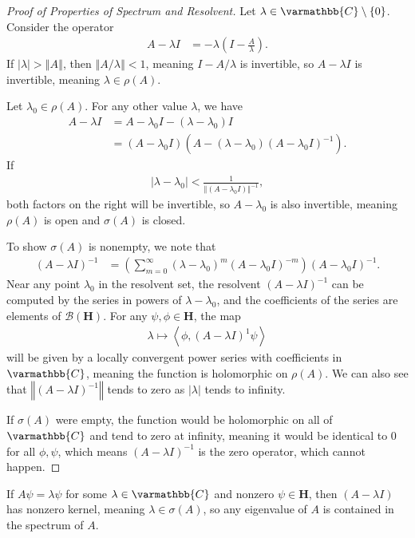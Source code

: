 \documentclass[12pt]{extarticle}
\newcommand{\C}{\varmathbb{C}}
\newcommand{\iprod}[2]{\left\langle #1,#2\right\rangle}
\newcommand{\norm}[1]{\left\Vert #1\right\Vert}
\theoremstyle{plain}
\theoremstyle{definition}
\theoremstyle{remark}
\renewcommand{\newline}{\hfill\break}
\begin{document}
  \begin{proof}[Proof of Properties of Spectrum and Resolvent]
    Let $\lambda \in \C\setminus \{0\}$. Consider the operator
    \begin{align*}
      A - \lambda I &= -\lambda \left(I - \frac{A}{\lambda}\right).
    \end{align*}
    If $|\lambda| > \norm{A}$, then $\norm{A / \lambda} < 1$, meaning $I - A/\lambda$ is invertible, so $A - \lambda I$ is invertible, meaning $\lambda \in \rho(A)$.\newline

    Let $\lambda_0\in \rho(A)$. For any other value $\lambda$, we have
    \begin{align*}
      A - \lambda I &= A - \lambda_0 I - (\lambda - \lambda_0)I\\
                    &= (A-\lambda_0 I)\left(A - (\lambda - \lambda_0)(A-\lambda_0 I)^{-1}\right).
    \end{align*}
    If
    \begin{align*}
      |\lambda - \lambda_0| < \frac{1}{\norm{(A - \lambda_0 I)}^{-1}},
    \end{align*}
    both factors on the right will be invertible, so $A - \lambda_0$ is also invertible, meaning $\rho(A)$ is open and $\sigma(A)$ is closed.\newline

    To show $\sigma(A)$ is nonempty, we note that
    \begin{align*}
      \left(A - \lambda I\right)^{-1} &= \left(\sum_{m=0}^{\infty}\left(\lambda - \lambda_0\right)^m\left(A - \lambda_0 I\right)^{-m}\right)\left(A - \lambda_0 I\right)^{-1}.
    \end{align*}
    Near any point $\lambda_0$ in the resolvent set, the resolvent $(A-\lambda I)^{-1}$ can be computed by the series in powers of $\lambda - \lambda_0$, and the coefficients of the series are elements of $\mathcal{B}\left(\mathbf{H}\right)$. For any $\psi,\phi \in \mathbf{H}$, the map
    \begin{align*}
      \lambda \mapsto \iprod{\phi}{(A-\lambda I)^{1}\psi}
    \end{align*}
    will be given by a locally convergent power series with coefficients in $\C$, meaning the function is holomorphic on $\rho(A)$. We can also see that $\norm{\left(A-\lambda I\right)^{-1}}$ tends to zero as $|\lambda|$ tends to infinity.\newline

    If $\sigma(A)$ were empty, the function would be holomorphic on all of $\C$ and tend to zero at infinity, meaning it would be identical to $0$ for all $\phi,\psi$, which means $\left(A-\lambda I\right)^{-1}$ is the zero operator, which cannot happen.
  \end{proof}
  If $A\psi = \lambda \psi$ for some $\lambda \in \C$ and nonzero $\psi \in \mathbf{H}$, then $(A - \lambda I)$ has nonzero kernel, meaning $\lambda \in \sigma(A)$, so any eigenvalue of $A$ is contained in the spectrum of $A$.\newline
\end{document}
